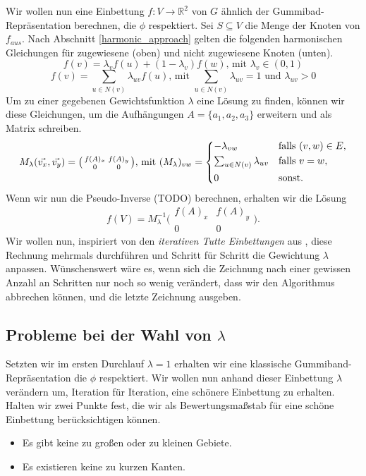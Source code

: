 Wir wollen nun eine Einbettung $f:V\to \mathbb{R}^2$ von $G$ ähnlich der Gummibad-Repräsentation berechnen, die $\phi$ respektiert. Sei $S \subseteq V$ die Menge der Knoten von $f_{aus}$. Nach Abschnitt \ref{harmonic_approach} gelten die folgenden harmonischen Gleichungen für zugewiesene (oben) und nicht zugewiesene Knoten (unten).
$$ f(v) = \lambda_v f(u) + (1-\lambda_v)f(w) \text{, mit } \lambda_v \in (0,1) $$
$$ f(v) = \sum_{u \in N(v)} \lambda_{uv} f(u) \text{, mit }  \sum_{u \in N(v)}\lambda_{uv} = 1 \text{ und } \lambda_{uv} > 0 $$
Um zu einer gegebenen Gewichtsfunktion $\lambda$ eine Lösung zu finden, können wir diese Gleichungen, um die Aufhängungen $A = \{a_1,a_2,a_3\}$ erweitern und als Matrix schreiben.
\[ M_{\lambda}(\vec{v_x},\vec{v_y}) = \big( \begin{smallmatrix}f(A)_x&f(A)_y\\ 0&0\end{smallmatrix} \big) \text{, mit } (M_{\lambda})_{vw} =
	\begin{dcases}
	-\lambda_{vw} & \text{falls } (v,w) \in E, \\
	\textstyle\sum_{u \in N(v)} \lambda_{uv} & \text{falls } v = w, \\
	0 & \text{sonst.} \\
	\end{dcases}
\]
Wenn wir nun die Pseudo-Inverse (TODO) berechnen, erhalten wir die Lösung
$$f(V) = M_{\lambda}^{-1}\big( \begin{smallmatrix}f(A)_x&f(A)_y\\ 0&0\end{smallmatrix} \big).$$
Wir wollen nun, inspiriert von den \textit{iterativen Tutte Einbettungen} aus \cite{fs17}, diese Rechnung mehrmals durchführen und Schritt für Schritt die Gewichtung $\lambda$ anpassen. Wünschenswert wäre es, wenn sich die Zeichnung nach einer gewissen Anzahl an Schritten nur noch so wenig verändert, dass wir den Algorithmus abbrechen können, und die letzte Zeichnung ausgeben.

\subsection{Probleme bei der Wahl von $\lambda$}

Setzten wir im ersten Durchlauf $\lambda = 1$ erhalten wir eine klassische Gummiband-Repräsentation die $\phi$ respektiert. Wir wollen nun anhand dieser Einbettung $\lambda$ verändern um, Iteration für Iteration, eine \glqq schönere\grqq{ } Einbettung zu erhalten. Halten wir zwei Punkte fest, die wir als Bewertungsmaßstab für eine schöne Einbettung berücksichtigen können.
\begin{itemize}
\item Es gibt keine zu großen oder zu kleinen Gebiete.
\item Es existieren keine zu kurzen Kanten.
\end{itemize}

